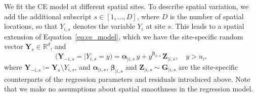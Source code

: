 \documentclass[
  12pt]{article}
\begin{document}
We fit the CE model at different spatial sites. 
To describe spatial variation, we add the additional subscript $s \in [1, \ldots, D]$, where $D$ is the number of spatial locations, so that $Y_{i,s}$ denotes the variable $Y_i$ at site $s$.
This leads to a spatial extension of Equation~\eqref{eq:ce_model}, which we have the site-specific random vector $\symbf{Y}_{s} \in \mathbb{R}^d$, and 
\begin{equation} \label{eq:ce_model_spat}
  \bigl(\symbf{Y}_{-i, s} = \mid Y_{i, s} = y\bigr) 
    = \symbf{\alpha}_{\mid i, s} \, y 
      + y^{\symbf{\beta}_{\mid i, s}} \, \symbf{Z}_{\mid i, s}, 
      \quad y > u_i, 
\end{equation}
where $\symbf{Y}_{-i, s} \coloneqq \symbf{Y}_{s} \setminus Y_{i, s}$, and $\symbf{\alpha}_{\mid i, s}$, $\symbf{\beta}_{\mid i, s}$ and $\symbf{Z}_{\mid i, s} \sim \symbf{G}_{\mid i, s}$ are the site-specific counterparts of the regression parameters and residuals introduced above.
Note that we make no assumptions about spatial smoothness in the regression model. 
\end{document}

